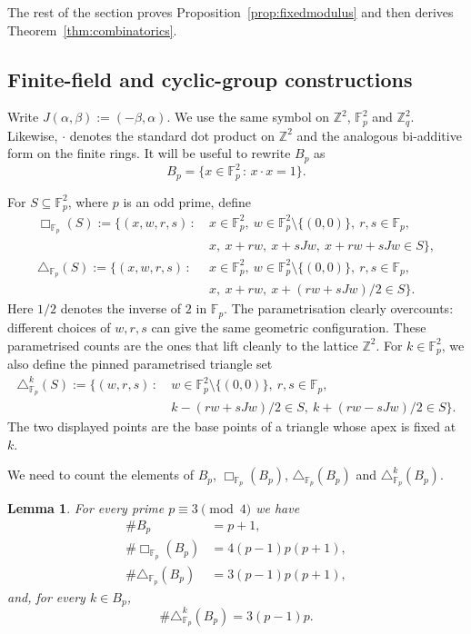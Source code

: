 \documentclass[10pt,a4paper]{amsart}
\newtheorem{lemma}[theorem]{Lemma}
\numberwithin{equation}{section}
\begin{document}
The rest of the section proves Proposition~\ref{prop:fixedmodulus} and then derives Theorem~\ref{thm:combinatorics}.

\subsection{Finite-field and cyclic-group constructions}
Write $J(\alpha,\beta):=(-\beta,\alpha)$. We use the same symbol on $\mathbb{Z}^2$, $\mathbb{F}_p^2$ and $\mathbb{Z}_q^2$. Likewise, $\cdot$ denotes the standard dot product on $\mathbb{Z}^2$ and the analogous bi-additive form on the finite rings.
It will be useful to rewrite $B_p$ as
\[ B_p = \{x\in\mathbb{F}_p^2 \,:\, x\cdot x=1\}. \]

For $S\subseteq\mathbb{F}_p^2$, where $p$ is an odd prime, define
\begin{align*}
\Box_{\mathbb{F}_p}(S):=\{(x,w,r,s) \,:\ & x\in\mathbb{F}_p^2,
\ w\in \mathbb{F}_p^2\setminus\{(0,0)\},\ r,s\in\mathbb{F}_p,\\
&x,\ x+rw,\ x+sJw,\ x+rw+sJw\in S\},\\
\triangle_{\mathbb{F}_p}(S):=\{(x,w,r,s) \,:\ & x\in\mathbb{F}_p^2,
\ w\in \mathbb{F}_p^2\setminus\{(0,0)\},\ r,s\in\mathbb{F}_p,\\
&x,\ x+rw,\ x+(rw+sJw)/2\in S\}.
\end{align*}
Here $1/2$ denotes the inverse of $2$ in $\mathbb{F}_p$.
The parametrisation clearly overcounts: different choices of $w,r,s$ can give the same geometric configuration. These parametrised counts are the ones that lift cleanly to the lattice $\mathbb{Z}^2$.
For $k\in \mathbb{F}_p^2$, we also define the pinned parametrised triangle set
\begin{align*}
\triangle^k_{\mathbb{F}_p}(S) := \{(w,r,s) \,:\ & w\in\mathbb{F}_p^2\setminus\{(0,0)\}, \ r,s\in\mathbb{F}_p,\\
& k-(rw+sJw)/2\in S,
\ k+(rw-sJw)/2\in S\}.
\end{align*}
The two displayed points are the base points of a triangle whose apex is fixed at $k$.

We need to count the elements of $B_p$, $\Box_{\mathbb{F}_p}(B_p)$, $\triangle_{\mathbb{F}_p}(B_p)$ and $\triangle^k_{\mathbb{F}_p}(B_p)$.

\begin{lemma}\label{lm:field}
For every prime $p\equiv3\pmod4$ we have
\begin{align} 
\#B_p & = p+1, \label{eq:Fpcount1} \\
\#\Box_{\mathbb{F}_p}(B_p) & = 4(p-1)p(p+1), \label{eq:Fpcount2} \\
\#\triangle_{\mathbb{F}_p}(B_p) & = 3(p-1)p(p+1), \label{eq:Fpcount3}
\end{align}
and, for every $k\in B_p$,
\begin{equation}
\#\triangle^k_{\mathbb{F}_p}(B_p) = 3(p-1)p. \label{eq:Fpcount4}
\end{equation}
\end{lemma}
\end{document}
